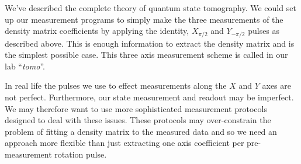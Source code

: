 \documentclass[twocolumn]{article}
\begin{document}
We've described the complete theory of quantum state tomography. We could set up our measurement programs to simply make the three measurements of the density matrix coefficients by applying the identity, $X_{\pi/2}$ and $Y_{-\pi/2}$ pulses as described above. This is enough information to extract the density matrix and is the simplest possible case. This three axis measurement scheme is called in our lab ``\emph{tomo}''.

In real life the pulses we use to effect measurements along the $X$ and $Y$ axes are not perfect. Furthermore, our state measurement and readout may be imperfect. We may therefore want to use more sophisticated measurement protocols designed to deal with these issues. These protocols may over-constrain the problem of fitting a density matrix to the measured data and so we need an approach more flexible than just extracting one axis coefficient per pre-measurement rotation pulse.
\end{document}
